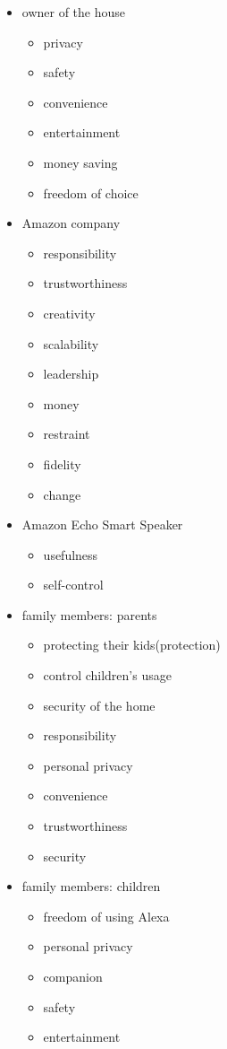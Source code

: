 \documentclass{article}
\begin{document}
\begin{itemize}

\item owner of the house
\begin{itemize}
\item privacy
\item safety
\item convenience
\item entertainment
\item money saving
\item freedom of choice
\end{itemize}

\item Amazon company
\begin{itemize}
    \item responsibility
    \item trustworthiness
    \item creativity
    \item scalability
    \item leadership
    \item money
    \item restraint
    \item fidelity
    \item change
\end{itemize}

\item Amazon Echo Smart Speaker
\begin{itemize}
    \item usefulness
    \item self-control
\end{itemize}

\item family members: parents
\begin{itemize}
    \item protecting their kids(protection)
    \item control children's usage
    \item security of the home
    \item responsibility
    \item personal privacy
    \item convenience
    \item trustworthiness
    \item security
\end{itemize}

\item family members: children
\begin{itemize}
    \item freedom of using Alexa
    \item personal privacy
    \item companion
    \item safety
    \item entertainment
\end{itemize}


\end{itemize}
\end{document}

